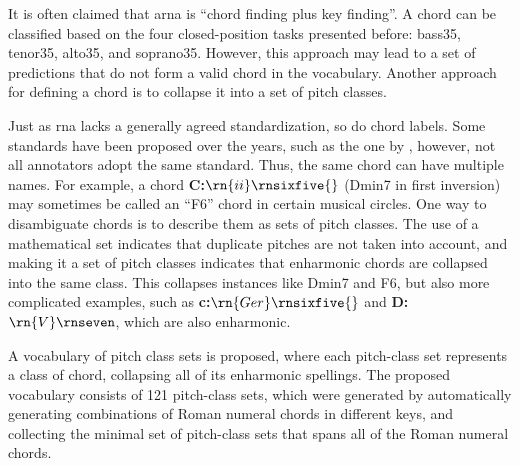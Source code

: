 
It is often claimed that \gls{arna} is ``chord finding plus
key finding''. A chord can be classified based on the four
\gls{closed-position} tasks presented before: \gls{bass35},
\gls{tenor35}, \gls{alto35}, and \gls{soprano35}. However,
this approach may lead to a set of predictions that do not
form a valid chord in the vocabulary. Another approach for
defining a chord is to collapse it into a set of pitch
classes.

Just as \gls{rna} lacks a generally agreed standardization,
so do chord labels. Some standards have been proposed over
the years, such as the one by \textcite{harte2005automatic},
however, not all annotators adopt the same standard. Thus,
the same chord can have multiple names. For example, a chord
\textbf{C:}$\rn{ii}\rnsixfive{}$ (Dmin7 in first inversion) may
sometimes be called an ``F6'' chord in certain musical
circles. One way to disambiguate chords is to describe them
as sets of pitch classes. The use of a mathematical set
indicates that duplicate pitches are not taken into account,
and making it a set of pitch classes indicates that
enharmonic chords are collapsed into the same class. This
collapses instances like Dmin7 and F6, but also more
complicated examples, such as \textbf{c:}$\rn{Ger}\rnsixfive{}$ and
\textbf{D\musFlat{}:}$\rn{V}\rnseven$, which are also enharmonic.

A vocabulary of pitch class sets is proposed, where each
pitch-class set represents a class of chord, collapsing all
of its enharmonic spellings. The proposed vocabulary
consists of 121 pitch-class sets, which were generated by
automatically generating combinations of Roman numeral
chords in different keys, and collecting the minimal set of
pitch-class sets that spans all of the Roman numeral chords.


